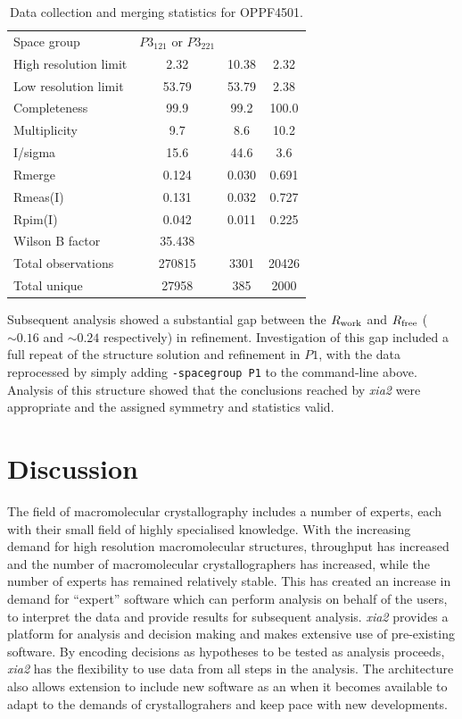 \documentclass[preprint,pdf]{iucr}
\begin{document}
\begin{table}
\caption{Data collection and merging statistics for OPPF4501.
\label{table:oppf4501}}
\begin{tabular}{lccc}
Space group & $P3_121$ or $P3_221$ & & \\
High resolution limit                   &	  2.32	& 10.38	&  2.32\\
Low resolution limit                    &	 53.79	& 53.79	&  2.38\\
Completeness                            &	 99.9	& 99.2&	100.0\\
Multiplicity                            &	  9.7&	  8.6	& 10.2\\
I/sigma                                 &	 15.6&	 44.6	&  3.6\\
Rmerge                                  &	0.124&	0.030&	0.691\\
Rmeas(I)                                &	0.131&	0.032&	0.727\\
Rpim(I)                                 &	0.042&	0.011&	0.225\\
Wilson B factor                         &	35.438   & & \\
Total observations                      &	270815	&3301&	20426\\
Total unique                            &	27958&	385&	2000\\
\end{tabular}
\end{table}

Subsequent analysis showed a substantial gap between the
$R_{\rm{work}}$ and $R_{\rm{free}}$ ($\sim 0.16$ and $\sim 0.24$
respectively) in refinement. Investigation of this gap included a full repeat
of the structure solution and refinement in $P1$, with the data
reprocessed by simply adding \verb|-spacegroup P1| to the command-line
above. Analysis of this structure showed that the conclusions reached
by \emph{xia2} were appropriate and the assigned symmetry and
statistics valid.

\section{Discussion}

The field of macromolecular crystallography includes a number of
experts, each with their small field of highly specialised
knowledge. With the increasing demand for high resolution
macromolecular structures, throughput has increased and the number of
macromolecular crystallographers has increased, while the number of
experts has remained relatively stable. This has created an increase
in demand for ``expert'' software which can perform analysis on behalf
of the users, to interpret the data and provide results for subsequent
analysis. \emph{xia2} provides a platform for analysis and decision
making and makes extensive use of pre-existing software. By encoding
decisions as hypotheses to be tested as analysis proceeds, \emph{xia2}
has the flexibility to use data from all steps in the analysis. The
architecture also allows extension to include new software as an when
it becomes available to adapt to the demands of crystallograhers and
keep pace with new developments.
\end{document}
